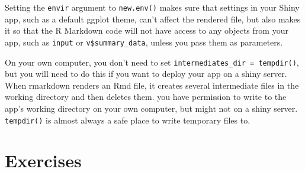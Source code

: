 \documentclass[
]{book}
\newenvironment{Shaded}{\begin{snugshade}}{\end{snugshade}}
\newcommand{\AttributeTok}[1]{\textcolor[rgb]{0.77,0.63,0.00}{#1}}
\newcommand{\ControlFlowTok}[1]{\textcolor[rgb]{0.13,0.29,0.53}{\textbf{#1}}}
\newcommand{\DocumentationTok}[1]{\textcolor[rgb]{0.56,0.35,0.01}{\textbf{\textit{#1}}}}
\newcommand{\FunctionTok}[1]{\textcolor[rgb]{0.00,0.00,0.00}{#1}}
\newcommand{\NormalTok}[1]{#1}
\newcommand{\OtherTok}[1]{\textcolor[rgb]{0.56,0.35,0.01}{#1}}
\newcommand{\SpecialCharTok}[1]{\textcolor[rgb]{0.00,0.00,0.00}{#1}}
\newcommand{\StringTok}[1]{\textcolor[rgb]{0.31,0.60,0.02}{#1}}
\begin{document}
\begin{Shaded}
\end{Shaded}

Setting the \texttt{envir} argument to \texttt{new.env()} makes sure that settings in your Shiny app, such as a default ggplot theme, can't affect the rendered file, but also makes it so that the R Markdown code will not have access to any objects from your app, such as \texttt{input} or \texttt{v\$summary\_data}, unless you pass them as parameters.

On your own computer, you don't need to set \texttt{intermediates\_dir\ =\ tempdir()}, but you will need to do this if you want to deploy your app on a shiny server. When rmarkdown renders an Rmd file, it creates several intermediate files in the working directory and then deletes them. you have permission to write to the app's working directory on your own computer, but might not on a shiny server. \texttt{tempdir()} is almost always a safe place to write temporary files to.

\hypertarget{exercises-reports}{%
\section{Exercises}\label{exercises-reports}}
\end{document}
